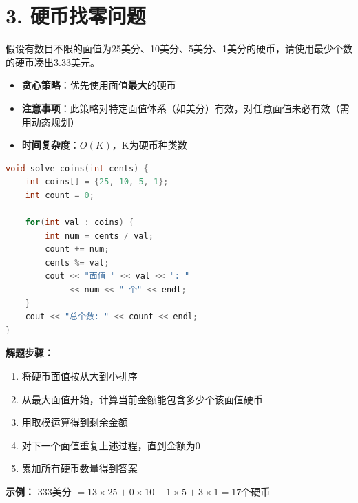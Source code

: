 \section*{3. 硬币找零问题}

假设有数目不限的面值为25美分、10美分、5美分、1美分的硬币，请使用最少个数的硬币凑出3.33美元。

\begin{itemize}
    \item \textbf{贪心策略}：优先使用面值\textbf{最大}的硬币
    \item \textbf{注意事项}：此策略对特定面值体系（如美分）有效，对任意面值未必有效（需用动态规划）
    \item \textbf{时间复杂度}：$O(K)$，K为硬币种类数
\end{itemize}

\begin{lstlisting}[language=C++, style=cppstyle]
void solve_coins(int cents) {
    int coins[] = {25, 10, 5, 1};
    int count = 0;

    for(int val : coins) {
        int num = cents / val;
        count += num;
        cents %= val;
        cout << "面值 " << val << ": "
             << num << " 个" << endl;
    }
    cout << "总个数: " << count << endl;
}
\end{lstlisting}

\textbf{解题步骤：}
\begin{enumerate}
    \item 将硬币面值按从大到小排序
    \item 从最大面值开始，计算当前金额能包含多少个该面值硬币
    \item 用取模运算得到剩余金额
    \item 对下一个面值重复上述过程，直到金额为0
    \item 累加所有硬币数量得到答案
\end{enumerate}

\textbf{示例：} 333美分 $= 13 \times 25 + 0 \times 10 + 1 \times 5 + 3 \times 1 = 17$个硬币
